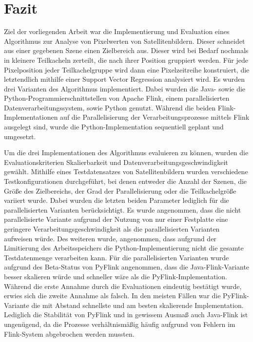 \chapter{Fazit}
Ziel der vorliegenden Arbeit war die Implementierung und Evaluation eines Algorithmus zur Analyse von Pixelwerten von Satellitenbildern. Dieser schneidet aus einer gegebenen Szene einen Zielbereich aus. Dieser wird bei Bedarf nochmals in kleinere Teilkacheln zerteilt, die nach ihrer Position gruppiert werden. Für jede Pixelposition jeder Teilkachelgruppe wird dann eine Pixelzeitreihe konstruiert, die letztendlich mithilfe einer Support Vector Regression analysiert wird. Es wurden drei Varianten des Algorithmus implementiert. Dabei wurden die Java- sowie die Python-Programmierschnittstellen von Apache Flink, einem parallelisierten Datenverarbeitungssystem, sowie Python genutzt. Während die beiden Flink-Implementationen auf die Parallelisierung der Verarbeitungsprozesse mittels Flink ausgelegt sind, wurde die Python-Implementation sequentiell geplant und umgesetzt.

Um die drei Implementationen des Algorithmus evaluieren zu können, wurden die Evaluationskriterien Skalierbarkeit und Datenverarbeitungsgeschwindigkeit gewählt. Mithilfe eines Testdatensatzes von Satellitenbildern wurden verschiedene Testkonfigurationen durchgeführt, bei denen entweder die Anzahl der Szenen, die Größe des Zielbereichs, der Grad der Parallelisierung oder die Teilkachelgröße variiert wurde. Dabei wurden die letzten beiden Parameter lediglich für die parallelisierten Varianten berücksichtigt.
Es wurde angenommen, dass die nicht parallelisierte Variante aufgrund der Nutzung von nur einer Festplatte eine geringere Verarbeitungsgeschwindigkeit als die parallelisierten Varianten aufweisen würde. Des weiteren wurde, angenommen, dass aufgrund der Limitierung des Arbeitsspeichers die Python-Implementierung nicht die gesamte Testdatenmenge verarbeiten kann. Für die parallelisierten Varianten wurde aufgrund des Beta-Status von PyFlink angenommen, dass die Java-Flink-Variante besser skalieren würde und schneller wäre als die PyFlink-Implementation. Während die erste Annahme durch die Evaluationen eindeutig bestätigt wurde, erwies sich die zweite Annahme als falsch. In den meisten Fällen war die PyFlink-Variante die mit Abstand schnellste und am besten skalierende Implementation. Lediglich die Stabilität von PyFlink und in gewissem Ausmaß auch Java-Flink ist ungenügend, da die Prozesse verhältnismäßig häufig aufgrund von Fehlern im Flink-System abgebrochen werden mussten.  

